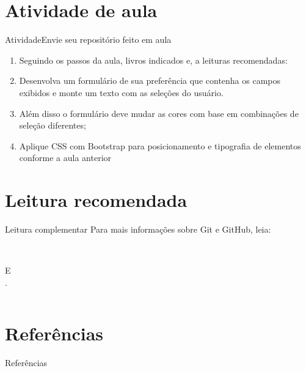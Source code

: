 \documentclass{beamer}
\begin{document}
\section{Atividade de aula}
\begin{frame}{Atividade}{Envie seu repositório feito em aula}
  \begin{enumerate}
      \item Seguindo os passos da aula, livros indicados e, a leituras recomendadas:
      \item Desenvolva um formulário de sua preferência que contenha os campos exibidos e monte um texto com as seleções do usuário.
      \item Além disso o formulário deve mudar as cores com base em combinações de seleção diferentes;
      \item Aplique CSS com Bootstrap para posicionamento e tipografia de elementos conforme a aula anterior
  \end{enumerate}


\end{frame}
\section{Leitura recomendada}
\begin{frame}{Leitura complementar}
 Para mais informações sobre Git e GitHub, leia:\\
  \vspace{0.6cm}
 \begin{columns}
   \begin{column}{0.4\textwidth}
 \cite{githubpages2022}\\
 E\\
 \cite{beer2015github}.
   \end{column}
   \begin{column}{0.4\textwidth}
   \end{column}

 \end{columns}
\end{frame}

\section{Referências}

\begin{frame}{Referências}%
\small
\begin{center}
\tiny


\end{center}
\end{frame}
\end{document}
